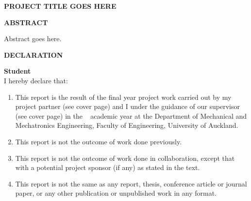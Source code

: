 \iftitlepage
    \clearpage{}
    \begin{flushleft}
    \reportNumber
    \par\end{flushleft}

    \vspace{1em}

    \begin{center}
    \textbf{\textsc{\large{}PROJECT TITLE GOES HERE}}{\large\par}
    \par\end{center}

    \vspace{2em}

    \begin{center}
    \textbf{\large{}\name}{\large\par}
    \par\end{center}

    \vspace{2em}

    \ifabstract
        \begin{center}
        \textbf{\textsc{\large{}ABSTRACT}}{\large\par}
        \par\end{center}

Abstract goes here.
    
    \fi

    \newpage{}
\fi


\ifdeclarationpage
    \begin{center}
        \vspace{20cm}
        \textbf{DECLARATION}
    \end{center}

    {\textbf{Student}}\\ 

    I hereby declare that: 
    \begin{enumerate}
    \item This report is the result of the final year project work carried out by my project partner (see  cover  page)  and  I  under  the  guidance  of  our  supervisor  (see  cover  page)  in  the \the\year~ academic  year  at  the  Department  of  Mechanical and Mechatronics Engineering,  Faculty  of Engineering, University of Auckland.
    \item This report is not the outcome of work done previously.
    \item This  report  is  not  the  outcome  of  work  done  in  collaboration,  except  that  with  a potential project sponsor (if any) as stated in the text.
    \item This report is not the same as any report, thesis, conference article or journal paper, or any other publication or unpublished work in any format.
    \end{enumerate}

